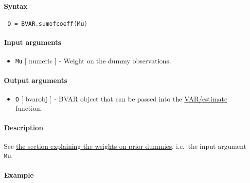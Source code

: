 


	\paragraph{Syntax}
 
 \begin{verbatim}
 O = BVAR.sumofcoeff(Mu)
 \end{verbatim}
 
 \paragraph{Input arguments}
 
 \begin{itemize}
 \item
   \texttt{Mu} {[} numeric {]} - Weight on the dummy observations.
 \end{itemize}
 
 \paragraph{Output arguments}
 
 \begin{itemize}
 \item
   \texttt{O} {[} bvarobj {]} - BVAR object that can be passed into the
   \url{VAR/estimate} function.
 \end{itemize}
 
 \paragraph{Description}
 
 See \href{BVAR/Contents}{the section explaining the weights on prior
 dummies}, i.e.~the input argument \texttt{Mu}.
 
 \paragraph{Example}


